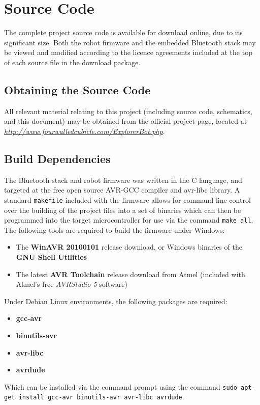 \chapter{Source Code}
\label{app:sourcecode}

The complete project source code is available for download online, due to its significant size. Both the robot firmware and the embedded Bluetooth stack may be viewed and modified according to the licence agreements included at the top of each source file in the download package.

\section{Obtaining the Source Code}

All relevant material relating to this project (including source code, schematics, and this document) may be obtained from the official project page, located at \\ \href{http://www.fourwalledcubicle.com/ExplorerBot.php}{\textit{http://www.fourwalledcubicle.com/ExplorerBot.php}}.

\section{Build Dependencies}

The Bluetooth stack and robot firmware was written in the C language, and targeted at the free open source AVR-GCC compiler and avr-libc library. A standard \texttt{makefile} included with the firmware allows for command line control over the building of the project files into a set of binaries which can then be programmed into the target microcontroller for use via the command \texttt{make all}. The following tools are required to build the firmware under Windows:

\begin{itemize}
	\item The \textbf{WinAVR 20100101} release download, or Windows binaries of the \textbf{GNU Shell Utilities}
	\item The latest \textbf{AVR Toolchain} release download from Atmel (included with Atmel's free \textit{AVRStudio 5} software)
\end{itemize}

Under Debian Linux environments, the following packages are required:

\begin{itemize}
	\item \textbf{gcc-avr} 
	\item \textbf{binutils-avr}
	\item \textbf{avr-libc}
	\item \textbf{avrdude}
\end{itemize}

Which can be installed via the command prompt using the command \texttt{sudo apt-get install gcc-avr binutils-avr avr-libc avrdude}.